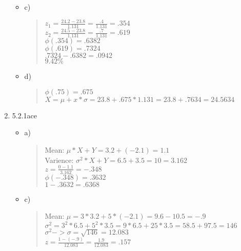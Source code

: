 \documentclass{article}
\begin{document}
\begin{enumerate}
\begin{itemize}
            \item c)
            \begin{quote}
                $z_1 = \frac{24.2-23.8}{1.131} = \frac{.4}{1.131} = .354$ \\
                $z_2 = \frac{24.5 - 23.8}{1.131} = \frac{.7}{1.131} = .619$ \\
                $\phi(.354) = .6382$ \\
                $\phi(.619) = .7324$ \\
                $.7324-.6382 = .0942$ \\
                $9.42\%$
            \end{quote}
        \end{itemize}
        \begin{itemize}
            \item d)
            \begin{quote}
                $\phi(.75) = .675$ \\
                $X = \mu+x*\sigma = 23.8+.675*1.131 = 23.8+.7634 = 24.5634$
            \end{quote}
        \end{itemize}
    \item 5.2.1ace 
        \begin{itemize}
            \item a)
            \begin{quote}
                Mean: $\mu*X+Y = 3.2+(-2.1) = 1.1$ \\
                Varience: $\sigma^{2}*X+Y = 6.5+3.5 = 10 = 3.162$ \\
                $z = \frac{0-1.1}{3.162} = -.348$ \\
                $\phi(-.348) = .3632$ \\
                $1-.3632 = .6368$
            \end{quote}
        \end{itemize}
        \begin{itemize}
            \item c)
            \begin{quote}
                Mean: $\mu = 3*3.2+5*(-2.1) = 9.6-10.5 = -.9$ \\
                $\sigma^{2} = 3^{2}*6.5+5^{2}*3.5 = 9*6.5+25*3.5 = 58.5+97.5 = 146$ \\
                $\sigma^{2} -> \sigma = \sqrt{146} = 12.083$ \\
                $z = \frac{1-(-.9)}{12.083} = \frac{1.9}{12.083} = .157$ \\

\end{quote}
\end{itemize}
\end{enumerate}
\end{document}
